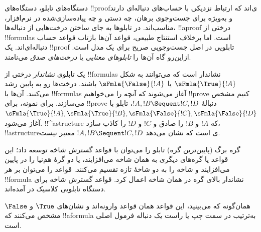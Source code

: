 \documentclass[../../../include/open-logic-section]{subfiles}
\begin{document}


دستگاه‌های تابلو، دستگاه‌های !!{proof}ی‌اند که ارتباط نزدیکی با
حساب‌های دنباله‌ای دارند و به‌ویژه برای جست‌وجوی برهان، چه دستی و چه
پیاده‌سازی‌شده در نرم‌افزار، مناسب‌اند. در تابلوها به جای ساختن
درخت‌هایی از دنباله‌ها، !!a{proof} درختی از !!{formula}s است. اما
برخلاف استنتاج طبیعی، قواعد آن‌ها بازتاب قواعد حساب دنباله‌ای‌اند. یک
!!{proof} تابلویی در اصل جست‌وجویی صریح برای یک مدل است. ازاین‌رو
گاه آن‌ها را \emph{تابلوهای معنایی} یا \emph{درخت‌های صدق} می‌نامند.

یک تابلوی \emph{نشاندار} درختی از !!{formula}s نشاندار است که
می‌توانند به شکل $\sFmla{\True}{!A}$ یا $\sFmla{\False}{!A}$ باشند.
درخت‌ها رو به پایین رشد می‌کنند. آن‌ها با !!{formula}s آغاز می‌شوند
که آنچه را می‌خواهیم !!{prove} کنیم مشخص می‌سازند. برای نمونه، برای
!!{prove} دنبالهٔ $!A, !B \Sequent !C, !D$، تابلو با
$\sFmla{\True}{!A}, \sFmla{\True}{!B},
\sFmla{\False}{!C}, \sFmla{\False}{!D}$ آغاز می‌شود.
!!^a{structure} که $!A$ و $!B$ را صادق و $!C$ و $!D$ را کاذب سازد،
!!a{structure}ی است که نشان می‌دهد
$!A, !B \Sequent !C, !D$ معتبر نیست.

گره برگ (پایین‌ترین گره) تابلو را می‌توان با قواعد گسترش شاخه توسعه
داد؛ این قواعد یا گره‌های دیگری به همان شاخه می‌افزایند، یا دو گرهٔ
هم‌نیا را در پایین می‌افزایند و شاخه را به دو شاخهٔ تازه تقسیم
می‌کنند. قواعد را می‌توان بر هر !!{formula} نشاندار بالای گره در همان
شاخه اعمال کرد. قواعد گسترش شاخه برای دستگاه تابلویی کلاسیک 
در  آمده‌اند.



همان‌گونه که می‌بینید، این قواعد همان قواعد  وارونه‌اند و
نشان‌های $\True$ و $\False$ مشخص می‌کنند که !!a{formula} به‌ترتیب در
سمت چپ یا راست یک دنباله فرمول اصلی است.
\end{document}
